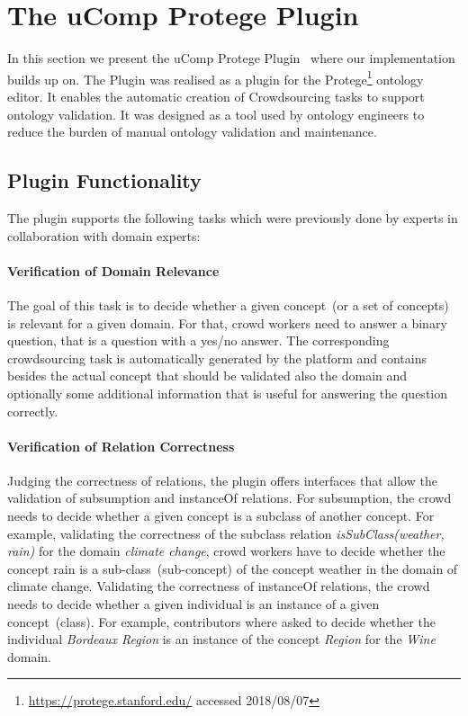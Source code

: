 \section{The uComp Protege Plugin}\label{sec:ucomp_protege_plugin}
In this section we present the uComp Protege Plugin~\cite{wohlgenannt2016} where our implementation builds up on. The Plugin was realised as a plugin for the Protege\footnote{\url{https://protege.stanford.edu/} accessed 2018/08/07} ontology editor. It enables the automatic creation of Crowdsourcing tasks to support ontology validation. It was designed as a tool used by ontology engineers to reduce the burden of manual ontology validation and maintenance.

\subsection{Plugin Functionality}
The plugin supports the following tasks which were previously done by experts in collaboration with domain experts:

\paragraph{Verification of Domain Relevance}
The goal of this task is to decide whether a given concept~(or a set of concepts) is relevant for a given domain. For that, crowd workers need to
answer a binary question, that is a question with a yes/no answer. The corresponding crowdsourcing task is automatically generated by the platform and
contains besides the actual concept that should be validated also the domain and optionally some additional information that is useful for answering 
the question correctly. 

\paragraph{Verification of Relation Correctness}
Judging the correctness of relations, the plugin offers interfaces that allow the validation of subsumption and instanceOf relations. 
For subsumption, the crowd needs to decide whether a given concept is a subclass of another concept. For example, validating the correctness
of the subclass relation \emph{isSubClass(weather, rain)} for the domain \emph{climate change}, crowd workers have to decide whether the concept rain is a sub-class~(sub-concept) of the concept weather in the domain of climate change. Validating the correctness of instanceOf relations, the crowd needs to decide whether a given individual is an instance of a given concept~(class). For example, contributors where asked to decide whether the individual \emph{Bordeaux Region} is an instance of the concept \emph{Region} for the \emph{Wine} domain. 

